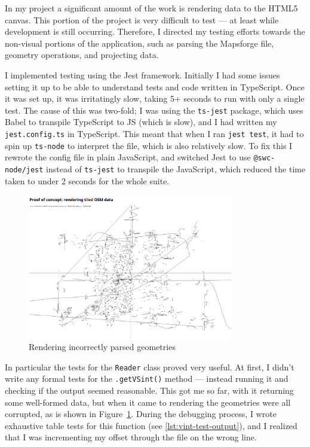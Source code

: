 \documentclass{final_report}
\begin{document}
In my project a significant amount of the work is rendering data to the HTML5 canvas. This portion of the project is very difficult to test --- at least while development is still occurring. Therefore, I directed my testing efforts towards the non-visual portions of the application, such as parsing the Mapsforge file, geometry operations, and projecting data.

I implemented testing using the Jest framework. Initially I had some issues setting it up to be able to understand tests and code written in TypeScript. Once it was set up, it was irritatingly slow, taking 5+ seconds to run with only a single test. The cause of this was two-fold; I was using the \texttt{ts-jest} package, which uses Babel to transpile TypeScript to JS (which is slow), and I had written my \texttt{jest.config.ts} in TypeScript. This meant that when I ran \texttt{jest test}, it had to spin up \texttt{ts-node} to interpret the file, which is also relatively slow. To fix this I rewrote the config file in plain JavaScript, and switched Jest to use \texttt{@swc-node/jest} instead of \texttt{ts-jest} to transpile the JavaScript, which reduced the time taken to under 2 seconds for the whole suite.

\begin{figure}[ht]
    \centering
    \includegraphics[width=0.8\textwidth]{../proof-of-concepts/4-rendering-osm-data/screenshots/artifacts.png}
    \caption{Rendering incorrectly parsed geometries}\label{fig:artifacts}
\end{figure}

In particular the tests for the \texttt{Reader} class proved very useful. At first, I didn't write any formal tests for the \texttt{.getVSint()} method --- instead running it and checking if the output seemed reasonable. This got me so far, with it returning some well-formed data, but when it came to rendering the geometries were all corrupted, as is shown in Figure~\ref{fig:artifacts}. During the debugging process, I wrote exhaustive table tests for this function (see \autoref{lst:vint-test-output}), and I realized that I was incrementing my offset through the file on the wrong line.
\end{document}
